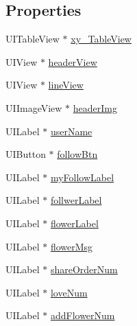 \subsection*{Properties}
\begin{DoxyCompactItemize}
\item 
U\+I\+Table\+View $\ast$ \mbox{\hyperlink{category_my_share_order_view_controller_07_08_a4daeac0fa2e0ae38d5fd14a1d40114ed}{xy\+\_\+\+Table\+View}}
\item 
U\+I\+View $\ast$ \mbox{\hyperlink{category_my_share_order_view_controller_07_08_ad48bdc2a4de8588bd3b2ed9cb2aec8ad}{header\+View}}
\item 
U\+I\+View $\ast$ \mbox{\hyperlink{category_my_share_order_view_controller_07_08_a4078324ebb96492461ca4fbd363d0baa}{line\+View}}
\item 
U\+I\+Image\+View $\ast$ \mbox{\hyperlink{category_my_share_order_view_controller_07_08_ab4139787046fb331d58ad6a7e9f82d0f}{header\+Img}}
\item 
U\+I\+Label $\ast$ \mbox{\hyperlink{category_my_share_order_view_controller_07_08_a39b7ad5426dc02ef11769150a8c5d022}{user\+Name}}
\item 
U\+I\+Button $\ast$ \mbox{\hyperlink{category_my_share_order_view_controller_07_08_aa73b04d0926438f89db1a11e4ea1e8ef}{follow\+Btn}}
\item 
U\+I\+Label $\ast$ \mbox{\hyperlink{category_my_share_order_view_controller_07_08_a52aa3f646b70fc9b1cfec2317aa0e2c6}{my\+Follow\+Label}}
\item 
U\+I\+Label $\ast$ \mbox{\hyperlink{category_my_share_order_view_controller_07_08_a593ff43d12b1a31c53ae61ea2c24eb1a}{follwer\+Label}}
\item 
U\+I\+Label $\ast$ \mbox{\hyperlink{category_my_share_order_view_controller_07_08_a056e29f934575efa7d1d1d75c5451b1a}{flower\+Label}}
\item 
U\+I\+Label $\ast$ \mbox{\hyperlink{category_my_share_order_view_controller_07_08_a1a51fef4e0c0b3f304b0e72df695e264}{flower\+Msg}}
\item 
U\+I\+Label $\ast$ \mbox{\hyperlink{category_my_share_order_view_controller_07_08_ada14ff476aae4a0151b9bbb9bbf1aa4f}{share\+Order\+Num}}
\item 
U\+I\+Label $\ast$ \mbox{\hyperlink{category_my_share_order_view_controller_07_08_a31befe3c2381e202d83e10cdc841dbff}{love\+Num}}
\item 
U\+I\+Label $\ast$ \mbox{\hyperlink{category_my_share_order_view_controller_07_08_a1466a6b55186a9fcfdecc9ac38f5e1ac}{add\+Flower\+Num}}

\end{DoxyCompactItemize}
